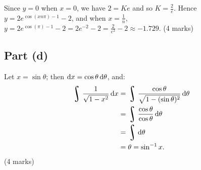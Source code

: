\documentclass[a4paper]{report}
\DeclareMathOperator*{\rint}{\scalerel*{\rotatebox{17}{$\!\int\!$}}{\int}}
\begin{document}
Since $ y = 0 $ when $ x = 0 $, we have $ 2 = Ke $ and so $ K = \frac{2}{e} $. Hence $ y = 2e^{\cos(xn \pi) - 1} - 2 $,
and when $ x = \frac{1}{n} $, $ y = 2e^{\cos(\pi) - 1} - 2 = 2e^{-2} - 2 = \frac{2}{e^2} - 2 \approx -1.729 $.
(4 marks)

\subsection*{Part (d)}
Let $ x = \sin \theta $; then $ \dif{x} = \cos \theta \dif{\theta} $, and:
\begin{align*}
  \rint \frac{1}{\sqrt{1 - x^2}} \dif{x} &= \rint \frac{\cos \theta}{\sqrt{1 - (\sin \theta)^2}} \dif{\theta}\\
                                         &= \rint \frac{\cos \theta}{\cos \theta} \dif{\theta}\\
                                         &= \rint \dif{\theta}\\
                                         &= \theta = \sin^{-1} x.
\end{align*}
(4 marks)
\end{document}
